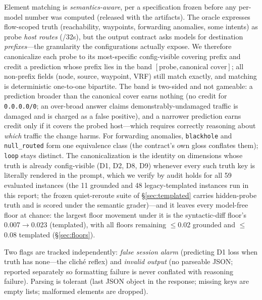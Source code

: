 \documentclass[11pt]{article}
\begin{document}
Element matching is \emph{semantics-aware}, per a specification frozen
before any per-model number was computed (released with the artifacts).
The oracle expresses flow-scoped truth (reachability, waypoints, forwarding
anomalies, some intents) as probe \emph{host routes} (/32s), but the output
contract asks models for destination \emph{prefixes}---the granularity the
configurations actually expose. We therefore canonicalize each probe to its
most-specific config-visible covering prefix and credit a prediction whose
prefix lies in the band $[\text{probe}, \text{canonical cover}]$; all
non-prefix fields (node, source, waypoint, VRF) still match exactly, and
matching is deterministic one-to-one bipartite. The band is two-sided and
not gameable: a prediction broader than the canonical cover earns nothing
(no credit for \texttt{0.0.0.0/0}; an over-broad answer claims
demonstrably-undamaged traffic is damaged and is charged as a false
positive), and a narrower prediction earns credit only if it covers the
probed host---which requires correctly reasoning about \emph{which} traffic
the change harms. For forwarding anomalies, \texttt{blackhole} and
\texttt{null\_routed} form one equivalence class (the contract's own gloss
conflates them); \texttt{loop} stays distinct. The canonicalization is the
identity on dimensions whose truth is already config-visible (D1, D2, D8, D9)
whenever every such truth key is literally rendered in the prompt, which we
verify by audit holds for all 59 evaluated instances (the 11 grounded and 48
legacy-templated instances run in this report; the frozen quiet-reroute suite of
\S\ref{sec:templated} carries hidden-probe truth and is scored under the semantic
grader)---and it leaves every
model-free floor at chance: the
largest floor movement under it is the syntactic-diff floor's
0.007$\to$0.023 (templated), with all floors remaining $\leq$0.02 grounded
and $\leq$0.08 templated (\S\ref{sec:floors}).

Two flags are tracked independently: \emph{false session alarm}
(predicting D1 loss when truth has none---the clich\'e reflex) and
\emph{invalid output} (no parseable JSON; reported separately so formatting
failure is never conflated with reasoning failure). Parsing is tolerant
(last JSON object in the response; missing keys are empty lists; malformed
elements are dropped).
\end{document}
